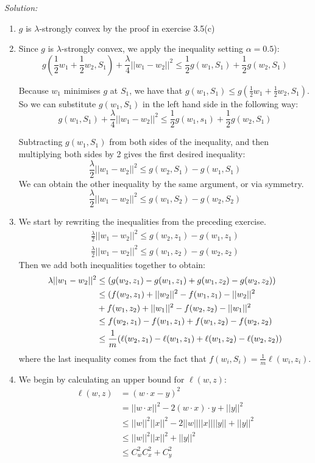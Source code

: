 \documentclass[
10pt, %
a4paper, %
oneside, %
headinclude,footinclude, %
BCOR5mm, %
]{scrartcl}
\newenvironment{solution}
               {\textit{Solution:}}
               {}
\begin{document}
\begin{solution}
  \begin{enumerate}
    \item $g$ is $\lambda$-strongly convex by the proof in exercise 3.5(c)
    \item Since $g$ is $\lambda$-strongly convex, we apply the inequality setting $\alpha=0.5$): $$g(\frac{1}{2} w_1 + \frac{1}{2}w_2, S_1) + \frac{\lambda}{4}||w_1-w_2||^2 \leq \frac{1}{2} g(w_1, S_1) + \frac{1}{2}g(w_2, S_1)$$

      Because $w_1$ minimises $g$ at $S_1$, we have that $g(w_1, S_1) \leq g(\frac{1}{2} w_1 + \frac{1}{2} w_2, S_1)$. So we can substitute $g(w_1, S_1)$ in the left hand side in the following way: $$g(w_1, S_1) + \frac{\lambda}{4}||w_1-w_2||^2 \leq \frac{1}{2}g(w_1, s_1) + \frac{1}{2}g(w_2, S_1)$$

      Subtracting $g(w_1, S_1)$ from both sides of the inequality, and then multiplying both sides by 2 gives the first desired inequality:
      $$\frac{\lambda}{2}||w_1-w_2||^2 \leq g(w_2,S_1)-g(w_1, S_1)$$
      We can obtain the other inequality by the same argument, or via symmetry.
      $$\frac{\lambda}{2}||w_1-w_2||^2 \leq g(w_1,S_2)-g(w_2, S_2)$$
    \item We start by rewriting the inequalities from the preceding exercise.
      \begin{align*}
        \frac{\lambda}{2}||w_1-w_2||^2 \leq g(w_2, z_1)-g(w_1, z_1) \\
        \frac{\lambda}{2}||w_1-w_2||^2 \leq g(w_1, z_2)-g(w_2, z_2)
      \end{align*}
      Then we add both inequalities together to obtain:
      \begin{align*}
        \lambda ||w_1-w_2||^2 &\leq (g(w_2,z_1)-g(w_1,z_1)+g(w_1,z_2)-g(w_2,z_2)) \\
        \hphantom{\lambda ||w_1-w_2||^2} &\leq (f(w_2,z_1) + ||w_2||^2 -f(w_1,z_1) - ||w_2||^2 \\
        \hphantom{\lambda ||w_1-w_2||^2}&+f(w_1,z_2) + ||w_1||^2-f(w_2,z_2) - ||w_1||^2 \\
        &\leq f(w_2,z_1)-f(w_1,z_1)+f(w_1,z_2)-f(w_2,z_2) \\
        &\leq \frac{1}{m} (\ell(w_2,z_1)-\ell(w_1,z_1)+\ell(w_1,z_2)-\ell(w_2,z_2))
      \end{align*}
      where the last inequality comes from the fact that $f(w_i,S_i) = \frac{1}{m}\ell(w_i, z_i)$.
      \item We begin by calculating an upper bound for $\ell(w,z)$: \begin{align*}
        \ell(w, z) &= (w \cdot x - y)^2 \\
        &= ||w\cdot x||^2 - 2 (w \cdot x) \cdot y + ||y||^2 \\
        &\leq ||w||^2 ||x||^2 - 2||w|| ||x|| ||y|| + ||y||^2 \\
        &\leq ||w||^2 ||x||^2 + ||y||^2 \\
        &\leq C_w^2C_x^2 + C_y^2
        \end{align*}


\end{enumerate}
\end{solution}
\end{document}
